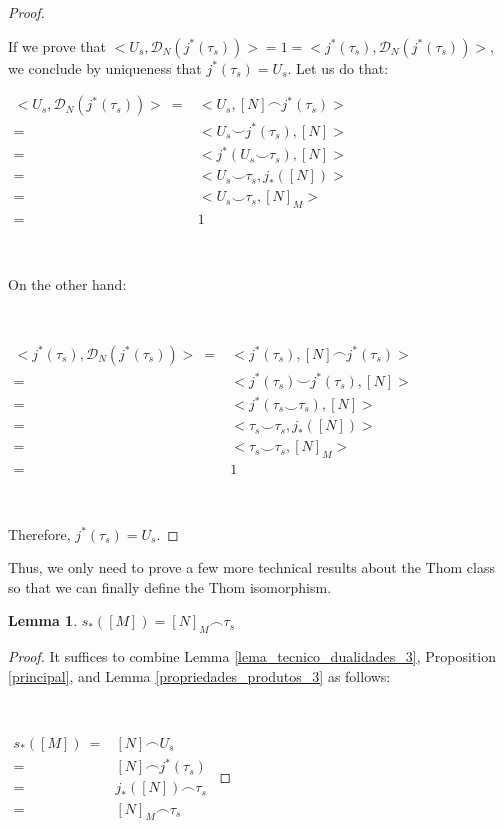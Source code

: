 \documentclass[12pt,oneside]{book}
\newtheorem{lem}    {Lemma}[chapter]
\newcommand{\ccup}{\smile}
\newcommand{\ccap}{\frown}
\begin{document}
\begin{proof}
        \
        
        If we prove that $<U_{s},\mathcal{D}_{N}(j^{*}(\tau_{s}))>=1=<j^{*}(\tau_{s}),\mathcal{D}_{N}(j^{*}(\tau_{s}))>$, we conclude by 
        uniqueness that $j^{*}(\tau_{s})=U_{s}$. Let us do that:

        $\begin{array}{rl}
        	<U_{s},\mathcal{D}_{N}(j^{*}(\tau_{s}))> \ = & <U_{s},[N]\ccap j^{*}(\tau_{s})> \\
        	= & <U_{s}\ccup j^{*}(\tau_{s}),[N]> \\
        	= & <j^{*}(U_{s}\ccup\tau_{s}),[N]> \\
        	= & <U_{s}\ccup\tau_{s},j_{*}([N])> \\
        	= & <U_{s}\ccup\tau_{s},[N]_{M}> \\
        	= & 1
        \end{array}$

        \

        On the other hand:

        \

        $\begin{array}{rl}
        	<j^{*}(\tau_{s}),\mathcal{D}_{N}(j^{*}(\tau_{s}))> \ = & <j^{*}(\tau_{s}),[N]\ccap j^{*}(\tau_{s})> \\
        	= & <j^{*}(\tau_{s})\ccup j^{*}(\tau_{s}),[N]> \\
        	= & <j^{*}(\tau_{s}\ccup\tau_{s}),[N]> \\
        	= & <\tau_{s}\ccup\tau_{s},j_{*}([N])> \\
        	= & <\tau_{s}\ccup\tau_{s},[N]_{M}> \\
        	= & 1
        \end{array}$

        \

        Therefore, $j^{*}(\tau_{s})=U_{s}$.

    \end{proof}

    Thus, we only need to prove a few more technical results about the Thom class so that we can finally define the Thom 
    isomorphism.

    \begin{lem}\label{lema_tecnico_dualidades_2}
    	$s_{*}([M]) = [N]_{M} \ccap \tau_{s}$
    \end{lem}
    \begin{proof}

    	It suffices to combine Lemma \ref{lema_tecnico_dualidades_3}, Proposition \ref{principal}, and Lemma \ref{propriedades_produtos_3} as 
        follows:

        \

    	$\begin{array}{rl}
    		s_{*}([M]) \ = & [N] \ccap U_{s} \\
    		= & [N] \ccap j^{*}(\tau_{s}) \\
    		= & j_{*}([N]) \ccap \tau_{s} \\
    		= & [N]_{M} \ccap \tau_{s}
    	\end{array}$

    \end{proof}
\end{document}
